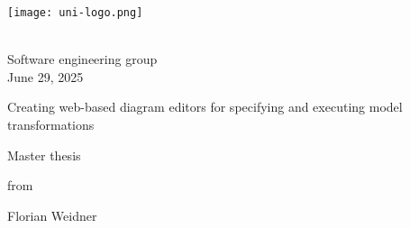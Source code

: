 \begin{titlepage}


\raggedleft

\vspace*{-4cm}

\hspace*{8cm}
\texttt{[image: uni-logo.png]}

\centering
\Large
\department  
\vspace{0.5cm}\\

\normalsize
Software engineering group \\
June 29, 2025

\vspace{1.5cm}
\LARGE
Creating web-based diagram editors for specifying and executing model transformations

\vspace{1cm}
\Large
Master thesis

\vspace*{\fill}

\Large
from

\vspace{0.5cm}
\LARGE
Florian Weidner \vspace{1cm}

\vspace{1cm}

\vspace*{\fill}

\end{titlepage}